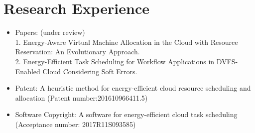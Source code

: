 \documentclass[letterpaper, UTF8]{article}
\begin{document}
	\section*{\textbf{Research Experience}}\vspace{-0.15in}
	\begin{itemize}	
		\item \small Papers: (under review)\\
		1. Energy-Aware Virtual Machine Allocation in the Cloud with Resource Reservation: An Evolutionary Approach.\\
		2. Energy-Efficient Task Scheduling for Workflow Applications in DVFS-Enabled Cloud Considering Soft Errors.
		\item Patent: A heuristic method for energy-efficient cloud resource scheduling and allocation (Patent number:201610966411.5)
		\item Software Copyright: A software for energy-efficient cloud task scheduling (Acceptance number: 2017R11S093585)
	\end{itemize}
	\vspace{-0.32in}
	
	\bigskip
\end{document}
